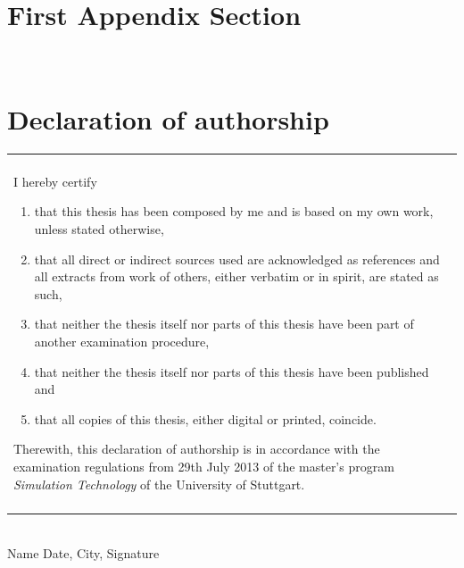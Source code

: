 \documentclass[twoside,a4paper]{article}
\begin{document}
%
%
\clearpage\newpage\null %
\newpage
\begin{appendices}
\section{First Appendix Section}

\newpage~\newpage
\section{Declaration of authorship}

\vspace{3cm}

\begin{table}[h!]
\centering
\begin{tabular}{|p{13cm}|}
\hline\\
	\todo{Change to bachelor thesis}
	I hereby certify
	\begin{enumerate}
		\item that this thesis has been composed by me and is based on my own work, unless stated otherwise,
		\item that all direct or indirect sources used are acknowledged as references and all extracts from work of others, either verbatim or in spirit, are stated as such,
		\item that neither the thesis itself nor parts of this thesis have been part of another examination procedure,
		\item that neither the thesis itself nor parts of this thesis have been published and
		\item that all copies of this thesis, either digital or printed, coincide.
	\end{enumerate}
	Therewith, this declaration of authorship is in accordance with the examination regulations from 29th July 2013 of the master's program \emph{Simulation Technology} of the University of Stuttgart.\\\\
\hline
\end{tabular}
\end{table}

\vspace{4cm}
\hrulefill\\
Name
\hspace{7cm}
Date, City, Signature
\end{appendices}
%
%
\clearpage\newpage\null %
\newpage
{}


\end{document}
